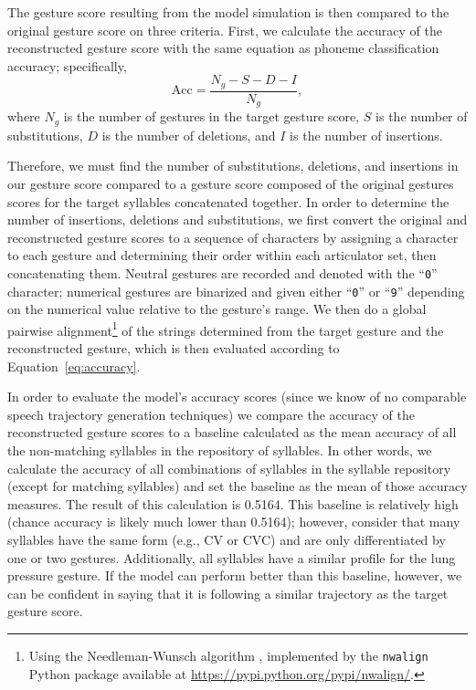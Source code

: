 The gesture score resulting from the model simulation
is then compared to the original gesture score
on three criteria.
First, we calculate the accuracy
of the reconstructed gesture score
with the same equation as phoneme classification accuracy;
specifically,
\begin{equation} \label{eq:accuracy}
  \text{Acc} = \frac{N_g - S - D - I}{N_g},
\end{equation}
where $N_g$ is the number of gestures
in the target gesture score,
$S$ is the number of substitutions,
$D$ is the number of deletions,
and $I$ is the number of insertions.

Therefore, we must find the number of
substitutions, deletions, and insertions
in our gesture score compared to
a gesture score composed of
the original gestures scores
for the target syllables
concatenated together.
In order to determine the number of
insertions, deletions and substitutions,
we first convert the original
and reconstructed gesture scores
to a sequence of characters
by assigning a character to each gesture
and determining their order
within each articulator set,
then concatenating them.
Neutral gestures are recorded
and denoted with the ``\texttt{0}'' character;
numerical gestures are binarized
and given either ``\texttt{0}'' or ``\texttt{9}''
depending on the numerical value
relative to the gesture's range.
We then do a global pairwise alignment\footnote{
  Using the Needleman-Wunsch algorithm \citep{needleman1970},
  implemented by the \texttt{nwalign} Python package
  available at
  \url{https://pypi.python.org/pypi/nwalign/}.}
of the strings determined
from the target gesture
and the reconstructed gesture,
which is then evaluated
according to Equation~\eqref{eq:accuracy}.

In order to evaluate
the model's accuracy scores
(since we know of no comparable
speech trajectory generation techniques)
we compare the accuracy
of the reconstructed gesture scores
to a baseline calculated as
the mean accuracy of all the
non-matching syllables in the
repository of syllables.
In other words, we calculate
the accuracy of all combinations
of syllables in the syllable repository
(except for matching syllables)
and set the baseline as the mean
of those accuracy measures.
The result of this calculation is 0.5164.
This baseline is relatively high
(chance accuracy is likely much lower than 0.5164);
however, consider that many syllables
have the same form (e.g., CV or CVC)
and are only differentiated by
one or two gestures.
Additionally, all syllables
have a similar profile for
the lung pressure gesture.
If the model can perform better
than this baseline, however,
we can be confident
in saying that it is
following a similar trajectory
as the target gesture score.

